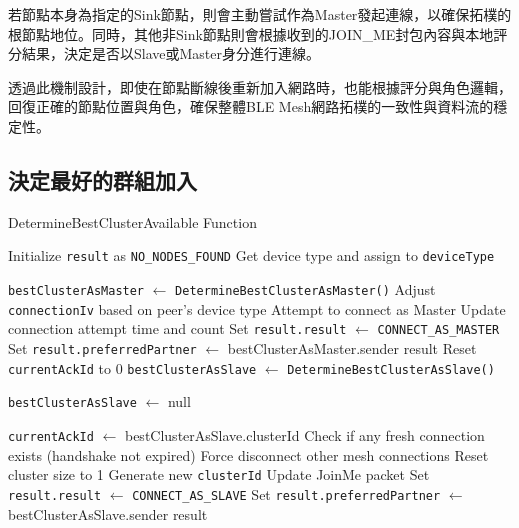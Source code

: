 \begin{ZhChapter}
若節點本身為指定的Sink節點，則會主動嘗試作為Master發起連線，以確保拓樸的根節點地位。同時，其他非Sink節點則會根據收到的JOIN\_ME封包內容與本地評分結果，決定是否以Slave或Master身分進行連線。

透過此機制設計，即使在節點斷線後重新加入網路時，也能根據評分與角色邏輯，回復正確的節點位置與角色，確保整體BLE Mesh網路拓樸的一致性與資料流的穩定性。

\subsection{決定最好的群組加入}

\begin{algorithm}
\caption{DetermineBestClusterAvailable Function}
\label{alg: DetermineBestClusterAvailable}
\begin{algorithmic}[1]
\State Initialize \texttt{result} as \texttt{NO\_NODES\_FOUND}
\State Get device type and assign to \texttt{deviceType}

    \State \texttt{bestClusterAsMaster} $\gets$ \texttt{DetermineBestClusterAsMaster()}
        \State Adjust \texttt{connectionIv} based on peer’s device type
        \State Attempt to connect as Master
            \State Update connection attempt time and count
        \EndIf
        \State Set \texttt{result.result} $\gets$ \texttt{CONNECT\_AS\_MASTER}
        \State Set \texttt{result.preferredPartner} $\gets$ bestClusterAsMaster.sender
        \State \Return result
    \EndIf
\Else
    \State Reset \texttt{currentAckId} to 0
    \State \texttt{bestClusterAsSlave} $\gets$ \texttt{DetermineBestClusterAsSlave()}

        \State \texttt{bestClusterAsSlave} $\gets$ null
    \EndIf

        \State \texttt{currentAckId} $\gets$ bestClusterAsSlave.clusterId
            \State Check if any fresh connection exists (handshake not expired)
                    \State Force disconnect other mesh connections
                    \State Reset cluster size to 1
                    \State Generate new \texttt{clusterId}
                \EndIf
            \EndIf
        \EndIf
        \State Update JoinMe packet
        \State Set \texttt{result.result} $\gets$ \texttt{CONNECT\_AS\_SLAVE}
        \State Set \texttt{result.preferredPartner} $\gets$ bestClusterAsSlave.sender
        \State \Return result
    \EndIf


\end{algorithmic}
\end{algorithm}
\end{ZhChapter}
